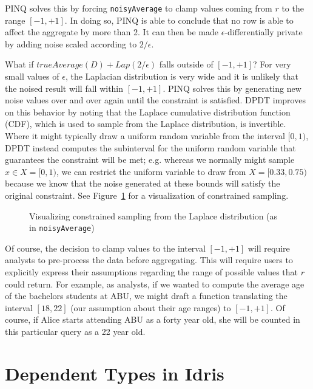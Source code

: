 \documentclass[12pt]{report}
\begin{document}
PINQ solves this by forcing \texttt{noisyAverage} to clamp values coming from $r$ to the range $[-1,+1]$.
In doing so, PINQ is able to conclude that no row is able to affect the aggregate by more than 2.
It can then be made $\epsilon$-differentially private by adding noise scaled according to $2/\epsilon$.

What if $trueAverage(D) + Lap(2/\epsilon)$ falls outside of $[-1,+1]$?
For very small values of $\epsilon$, the Laplacian distribution is very wide and it is unlikely that the noised result will fall within $[-1,+1]$.
PINQ solves this by generating new noise values over and over again until the constraint is satisfied.
DPDT improves on this behavior by noting that the Laplace cumulative distribution function (CDF), which is used to sample from the Laplace distribution, is invertible.
Where it might typically draw a uniform random variable from the interval $[0,1)$, DPDT instead computes the subinterval for the uniform random variable that guarantees the constraint will be met; e.g. whereas we normally might sample $x \in X=[0,1)$, we can restrict the uniform variable to draw from $X=[0.33,0.75)$ because we know that the noise generated at these bounds will satisfy the original constraint.
See Figure~\ref{fig:lapcdf} for a visualization of constrained sampling.

\begin{figure}
    \centering
    \def\svgwidth{\columnwidth}
    
    \caption{Visualizing constrained sampling from the Laplace distribution (as in \lstinline{noisyAverage})}
    \label{fig:lapcdf}
\end{figure}

Of course, the decision to clamp values to the interval $[-1,+1]$ will require analysts to pre-process the data before aggregating.
This will require users to explicitly express their assumptions regarding the range of possible values that $r$ could return.
For example, as analysts, if we wanted to compute the average age of the bachelors students at ABU, we might draft a function translating the interval $[18,22]$ (our assumption about their age ranges) to $[-1,+1]$.
Of course, if Alice starts attending ABU as a forty year old, she will be counted in this particular query as a 22 year old.

\chapter{Dependent Types in Idris}\label{sec:dependent_types_in_idris}
\end{document}
